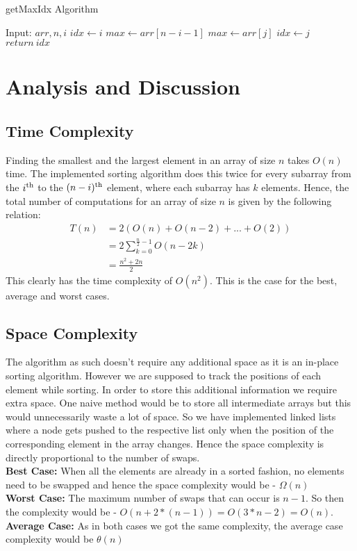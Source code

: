 \documentclass[letterpaper, 11 pt, conference]{ieeeconf}  %
\begin{document}
\begin{algorithm}[H]
\caption{getMaxIdx Algorithm}\label{alg:getMax}
\begin{algorithmic}
\State Input: $arr, n, i$
\State $idx \gets i$
\State $max \gets arr[n-i-1]$
    	\State $max \gets arr[j]$
        \State $idx \gets j$
    \EndIf
\EndFor
\State $return~idx$
\end{algorithmic}
\end{algorithm}

\section{Analysis and Discussion}
\subsection{Time Complexity}
Finding the smallest and the largest element in an array of size $n$ takes $O(n)$ time. The implemented sorting algorithm does this twice for every subarray from the $i\textsuperscript{th}$ to the $(n - i)\textsuperscript{th}$ element, where each subarray has $k$ elements. Hence, the total number of computations for an array of size $n$ is given by the following relation:
\begin{align*}
T(n) &= 2(O(n) + O(n-2) + ... + O(2)) \\
&= 2\sum_{k=0}^{\frac{n}{2} - 1} O(n - 2k) \\
&= \frac{n^2 + 2n}{2}
\end{align*}
This clearly has the time complexity of $O(n^2)$. This is the case for the best, average and worst cases. \\ 
\subsection{Space Complexity}
The algorithm as such doesn't require any additional space as it is an in-place sorting algorithm. However we are supposed to track the positions of each element while sorting. In order to store this additional information we require extra space. One naive method would be to store all intermediate arrays but this would unnecessarily waste a lot of space. So we have implemented linked lists where a node gets pushed to the respective list only when the position of the corresponding element in the array changes. Hence the space complexity is directly proportional to the number of swaps. \\ 
\textbf{Best Case:} When all the elements are already in a sorted fashion, no elements need to be swapped and hence the space complexity would be - $\Omega (n)$ \\ 
\textbf{Worst Case:} The maximum number of swaps that can occur is $n-1$. So then the complexity would be - $O(n + 2*(n-1)) = O(3*n - 2) = O(n)$. \\ 
\textbf{Average Case:} As in both cases we got the same complexity, the average case complexity would be $\theta (n)$
 \\ 
\end{document}
